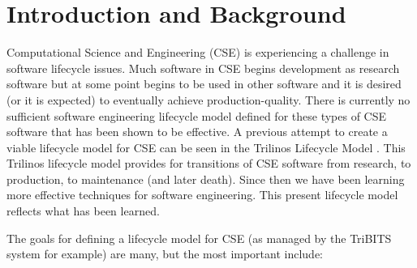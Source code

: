 \documentclass[11pt]{SANDreport}
\begin{document}
%
\SANDmain %




%
\section{Introduction and Background}
%

Computational Science and Engineering (CSE) is experiencing a
challenge in software lifecycle issues.  Much software in CSE begins
development as research software but at some point begins to be used
in other software and it is desired (or it is expected) to eventually
achieve production-quality.  There is currently no sufficient software
engineering lifecycle model defined for these types of CSE software
that has been shown to be effective.  A previous attempt to create a
viable lifecycle model for CSE can be seen in the Trilinos Lifecycle
Model {}\cite{TrilinosLifecycleModel2007}.  This Trilinos lifecycle
model provides for transitions of CSE software from research, to
production, to maintenance (and later death).  Since then we have
been learning more effective techniques for software engineering.  This
present lifecycle model reflects what has been learned.

The goals for defining a lifecycle model for CSE (as managed by the
TriBITS system for example) are many, but the most important include:
\end{document}
